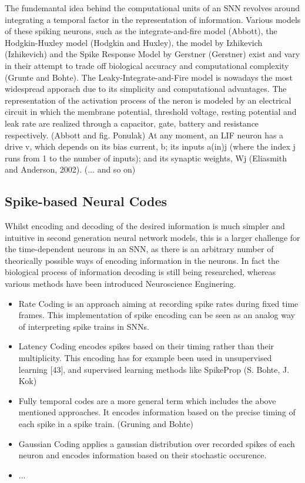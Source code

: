 \documentclass[letterpaper, 10 pt, conference]{ieeeconf}  %
\begin{document}
The fundemantal idea behind the computational units of an SNN revolves around integrating a temporal factor 
in the representation of information. Various models of these spiking neurons, such as the integrate-and-fire model (Abbott), 
the Hodgkin-Huxley model (Hodgkin and Huxley), the model by Izhikevich (Izhikevich) and the Spike Response Model by Gerstner (Gerstner) 
exist and vary in their attempt to trade off biological accuracy and computational complexity (Grunte and Bohte).
The Leaky-Integrate-and-Fire model is nowadays the most widespread apporach due to its simplicity and computational advantages. 
The representation of the activation process of the neron is modeled by an electrical circuit in which the membrane potential, threshold voltage,
resting potential and leak rate are realized through a capacitor, gate, battery and resistance respectively. (Abbott and fig. Ponulak)
\newline
At any moment, an LIF neuron has a drive v, which depends on its bias
current, b; its inputs a(in)j (where the index j runs from 1 to the number
of inputs); and its synaptic weights, Wj (Eliasmith and Anderson, 2002). (... and so on)

\subsection{Spike-based Neural Codes}

Whilst encoding and decoding of the desired information is much simpler and intuitive in second generation neural network models,
this is a larger challenge for the time-dependent neurons in an SNN, as there is an arbitrary 
number of theorically possible ways of encoding information in the neurons. In fact the biological process of information decoding is 
still being researched, whereas various methods have been introduced Neuroscience Enginering.

\begin{itemize}

        \item Rate Coding is an approach aiming at recording spike rates during fixed time frames. This implementation of spike encoding can be seen as an analog way of interpreting spike trains in SNNs.
        \item Latency Coding encodes spikes based on their timing rather than their multiplicity. This encoding has for example been used in unsupervised learning [43], and
        supervised learning methods like SpikeProp (S. Bohte, J. Kok)
        \item Fully temporal codes are a more general term which includes the above mentioned approaches. It encodes information based on the precise
        timing of each spike in a spike train. (Gruning and Bohte)
        \item Gaussian Coding applies a gaussian distribution over recorded spikes of each neuron and encodes information based on their stochastic occurence.
        \item ...
        
\end{itemize}        
\end{document}
